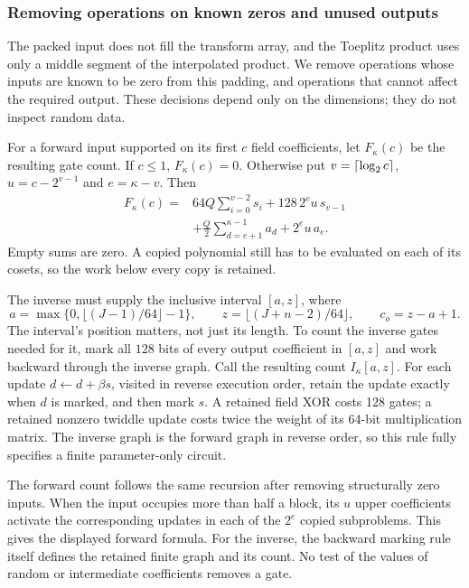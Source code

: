 \documentclass[b5paper, 10pt, abstract=true, captions=tableheading]{scrartcl}
\theoremstyle{plain}
\theoremstyle{definition}
\begin{document}
\subsubsection{Removing operations on known zeros and unused outputs}
The packed input does not fill the transform array, and the Toeplitz
product uses only a middle segment of the interpolated product. We remove
operations whose inputs are known to be zero from this padding, and
operations that cannot affect the required output. These decisions depend
only on the dimensions; they do not inspect random data.

For a forward input supported on its first $c$ field coefficients,
let $F_\kappa(c)$ be the resulting gate count. If \(c\le1\), \(F_\kappa(c)=0\).
Otherwise put \(v=\left\lceil \log_2 c\right\rceil\), \(u=c-2^{v-1}\) and
\(e=\kappa-v\). Then
\begin{equation}
 \begin{split}
 F_\kappa(c)={}&64Q\sum_{i=0}^{v-2}s_i
             +128\,2^e u\,s_{v-1}\\
             &+\frac Q2\sum_{d=e+1}^{\kappa-1}a_d
             +2^e u\,a_e .
 \end{split}
 \label{eq:wopt-forwardprune}
\end{equation}
Empty sums are zero. A copied polynomial still has to be evaluated
on each of its cosets, so the work below every copy is retained.

The inverse must supply the inclusive interval \([a,z]\), where
\[
 a=\max\{0,\lfloor(J-1)/64\rfloor-1\},\qquad
 z=\lfloor(J+n-2)/64\rfloor,\qquad c_o=z-a+1.
\]
The interval's position matters, not just its length. To count the
inverse gates needed for it, mark all $128$ bits of every output
coefficient in $[a,z]$ and work backward through the inverse graph.
Call the resulting count $I_\kappa[a,z]$.
For each update \(d\leftarrow d+\beta s\), visited in reverse execution
order, retain the update exactly when \(d\) is marked, and then mark
\(s\). A retained field XOR costs 128 gates; a retained nonzero twiddle
update costs twice the weight of its 64-bit multiplication matrix.
The inverse graph is the forward graph in reverse order, so this rule
fully specifies a finite parameter-only circuit.

The forward count follows the same recursion after removing structurally
zero inputs. When the input occupies more than half a block, its $u$
upper coefficients activate the corresponding updates in each of the
$2^e$ copied subproblems. This gives the displayed forward formula.
For the inverse, the backward marking rule itself defines the retained
finite graph and its count. No test of the values of
random or intermediate coefficients removes a gate.
\end{document}
